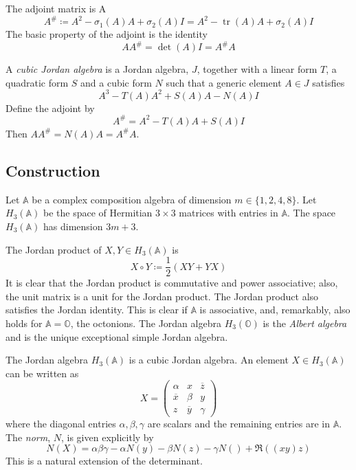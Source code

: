 \documentclass[12pt]{amsart}
\DeclareMathOperator{\tr}{tr}
\newcommand{\Dfn}[1]{\emph{\color{blue}#1}}
\newcommand\bA{\mathbb{A}}
\newcommand\bO{\mathbb{O}}
\begin{document}
The adjoint matrix is 
A\begin{equation*}
	A^\# \coloneqq A^2 - \sigma_1(A) A + \sigma_2(A)I = A^2 - \tr(A) A + \sigma_2(A)I
\end{equation*}
The basic property of the adjoint is the identity
\begin{equation*}
	AA^\# = \det(A)I = A^\#A
\end{equation*}

A \Dfn{cubic Jordan algebra} is a Jordan algebra, $J$, together with a linear form $T$, a quadratic form $S$
and a cubic form $N$ such that a generic element $A\in J$ satisfies
\begin{equation*}
	A^3 - T(A) A^2 + S(A)A - N(A)I
\end{equation*}
Define the adjoint by 
\begin{equation*}
	A^\# = A^2 - T(A) A + S(A)I
\end{equation*}
Then $AA^\# = N(A)A = A^\#A$.

\subsection{Construction}
Let $\bA$ be a complex composition algebra of dimension $m\in \{1,2,4,8\}$.
Let $H_3(\bA)$ be the space of Hermitian $3\times 3$ matrices with entries in $\bA$.
The space $H_3(\bA)$ has dimension $3m+3$.

The Jordan product of $X,Y\in H_3(\bA)$ is
\begin{equation*}
	X \circ Y \coloneqq \frac12 (XY+YX)
\end{equation*}
It is clear that the Jordan product is commutative and power associative; also, the unit matrix is a unit for the Jordan product. The Jordan product also satisfies the Jordan identity. This is clear if $\bA$ is associative, and, remarkably, also holds for $\bA=\bO$, the octonions. The Jordan algebra $H_3(\bO)$ is the \Dfn{Albert algebra} and is the unique exceptional simple Jordan algebra.

The Jordan algebra $H_3(\bA)$ is a cubic Jordan algebra. An element $X\in H_3(\bA)$
can be written as
\begin{equation*}
	X=\begin{pmatrix}
		\alpha & x & \overline{z} \\
		\overline{x} & \beta & y \\
		z & \overline{y} & \gamma
	\end{pmatrix}
\end{equation*}
where the diagonal entries $\alpha,\beta,\gamma$ are scalars and the remaining entries are in $\bA$.
The \Dfn{norm}, $N$, is given explicitly by
\begin{equation*}
	N(X) = \alpha\beta\gamma - \alpha N(y) - \beta N(z) - \gamma N() + \Re ((xy)z)
\end{equation*}
This is a natural extension of the determinant.
\end{document}
